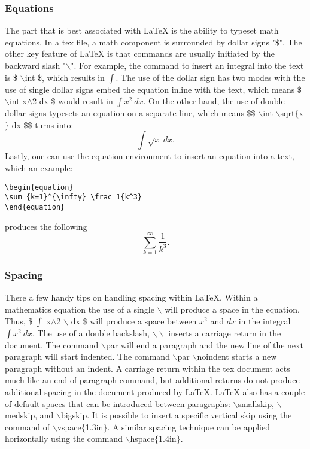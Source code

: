 \documentclass[twoside]{article}
\begin{document}
\subsubsection{Equations} The part that is best associated with LaTeX is the ability to typeset math equations. In a tex file, a math component is surrounded by dollar signs "\$". The other key feature of LaTeX is that commands are usually initiated by the backward slash "$\backslash$". For example, the command to insert an integral into the text is \$ $\backslash$int \$, which results in $\int$. The use of the dollar sign has two modes with the use of single dollar signs embed the equation inline with the text, which means \$ $\backslash$int x$\wedge$2 dx \$ would result in $\int x^2 \ dx$. On the other hand, the use of double dollar signs typesets an equation on a separate line, which means  \$\$ $\backslash$int $\backslash$sqrt$\{$x$\}$ dx \$\$ turns into:
$$\int \sqrt{x} \ dx.$$
Lastly, one can use the equation environment to insert an equation into a text, which an example: 
\begin{verbatim}
\begin{equation}
\sum_{k=1}^{\infty} \frac 1{k^3}    
\end{equation}
\end{verbatim}
produces the following
\begin{equation}
\sum_{k=1}^{\infty} \frac 1{k^3}.    
\end{equation}

\subsubsection{Spacing}
There a few handy tips on handling spacing within LaTeX. Within a mathematics equation the use of a single
$\backslash$ will produce a space in the equation. Thus, \$ $\int$ x$\wedge$2 $\backslash$ dx \$ will produce a space between $x^2$ and $dx$ in the integral $\int x^2 \ dx$. The use of a double backslash, $\backslash \backslash$ inserts a carriage return in the document. The command $\backslash$par will end a paragraph and the new line of the next paragraph will start indented. The command $\backslash$par $\backslash$noindent starts a new paragraph without an indent. A carriage return within the tex document acts much like an end of paragraph command, but additional returns do not produce additional spacing in the document produced by LaTeX. LaTeX also has a couple of default spaces that can be introduced between paragraphs: $\backslash$smallskip, $\backslash$medskip, and $\backslash$bigskip. It is possible to insert a specific vertical skip using the command of $\backslash$vspace$\{$1.3in$\}$. A similar spacing technique can be applied horizontally using the command $\backslash$hspace$\{$1.4in$\}$. 
\end{document}
